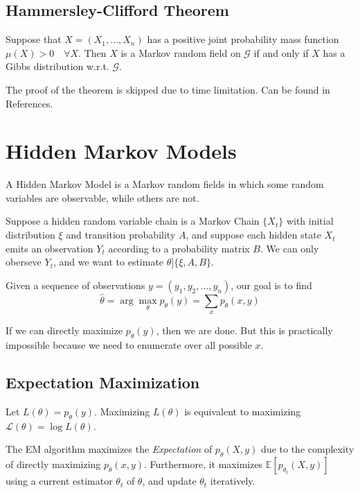     \subsection{Hammersley-Clifford Theorem}
        \begin{theorem}\label{Thm:HammersleyClifford}
            Suppose that $X=(X_1,\dots,X_n)$ has a positive joint probability mass function $\mu(X) > 0 \quad \forall X$. Then $X$ is a Markov random field on $\mathcal{G}$ if and only if $X$ has a Gibbs distribution w.r.t. $\mathcal{G}$.
        \end{theorem}

        The proof of the theorem is skipped due to time limitation. Can be found in References.


\section{Hidden Markov Models}
    A Hidden Markov Model is a Markov random fields in which some random variables are observable, while others are not.

    Suppose a hidden random variable chain is a Markov Chain $\{X_t\}$ with initial distribution $\xi$ and transition probability $A$, and suppose each hidden state $X_t$ emits an observation $Y_t$ according to a probability matrix $B$. We can only oberseve $Y_t$, and we want to estimate $\theta ] \{\xi, A, B\}$.

    Given a sequence of observations $y = (y_1, y_2, \dots ,y_n)$, our goal is to find
    \[ \hat{\theta} = \arg\max_{\theta} p_{\theta}(y) = \sum_x p_{\theta}(x,y) \]

    If we can directly maximize $p_{\theta}(y)$, then we are done. But this is practically impossible because we need to enumerate over all possible $x$.
    
    \subsection{Expectation Maximization}
        Let $L(\theta) = p_{\theta}(y)$. Maximizing $L(\theta)$ is equivalent to maximizing $\mathcal{L}(\theta) = \log L(\theta)$.

        The EM algorithm maximizes the \emph{Expectation} of $p_{\theta}(X,y)$ due to the complexity of directly maximizing $p_{\theta}(x,y)$. Furthermore, it maximizes $\mathbb{E}[p_{\theta_t}(X,y)]$ using a current estimator $\theta_t$ of $\theta$, and update $\theta_t$ iteratively.

